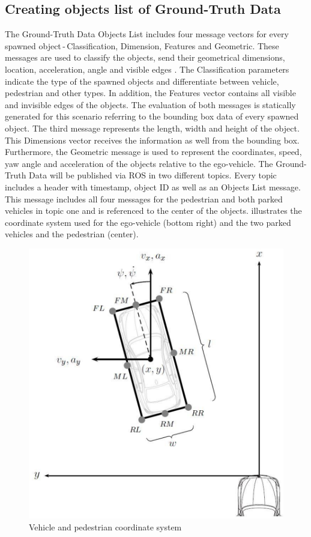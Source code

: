 \subsection{Creating objects list of Ground-Truth Data}
The Ground-Truth Data Objects List includes four message vectors for every spawned object\,-\,Classification, Dimension, Features and Geometric. These messages are used to classify the objects, send their geometrical dimensions, location, acceleration, angle and visible edges \cite{Aeberhard}.
The Classification parameters indicate the type of the spawned objects and differentiate between vehicle, pedestrian and other types. In addition, the Features vector contains all visible and invisible edges of the objects. The evaluation of both messages is statically generated for this scenario referring to the bounding box data of every spawned object. The third message represents the length, width and height of the object. This Dimensions vector receives the information as well from the bounding box. Furthermore, the Geometric message is used to represent the coordinates, speed, yaw angle and acceleration of the objects relative to the ego-vehicle. 
The Ground-Truth Data will be published via \ac{ROS} in two different topics. Every topic includes a header with timestamp, object \ac{ID} as well as an Objects List message. This message includes all four messages for the pedestrian and both parked vehicles in topic one and is referenced to the center of the objects.  illustrates the coordinate system used for the ego-vehicle (bottom right) and the two parked vehicles and the pedestrian (center). 
\begin{figure}[!h]
	\centering
	\includegraphics[scale=0.4]{images/KoordinatenSystem}
	\caption{Vehicle and pedestrian coordinate system}
	\label{coordinate}
\end{figure}

